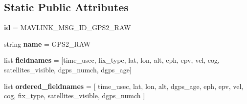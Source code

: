 \subsection*{Static Public Attributes}
\begin{DoxyCompactItemize}
\item 
\mbox{\label{classpymavlink_1_1dialects_1_1v10_1_1MAVLink__gps2__raw__message_a2f27c5748caecec007a6a31241020b2f}} 
{\bfseries id} = M\+A\+V\+L\+I\+N\+K\+\_\+\+M\+S\+G\+\_\+\+I\+D\+\_\+\+G\+P\+S2\+\_\+\+R\+AW
\item 
\mbox{\label{classpymavlink_1_1dialects_1_1v10_1_1MAVLink__gps2__raw__message_a249fe5ffeaf7b1a28dc012dd860c3f16}} 
string {\bfseries name} = \textquotesingle{}G\+P\+S2\+\_\+\+R\+AW\textquotesingle{}
\item 
\mbox{\label{classpymavlink_1_1dialects_1_1v10_1_1MAVLink__gps2__raw__message_aad5baf91d04e5888b9d4847061df9933}} 
list {\bfseries fieldnames} = \mbox{[}\textquotesingle{}time\+\_\+usec\textquotesingle{}, \textquotesingle{}fix\+\_\+type\textquotesingle{}, \textquotesingle{}lat\textquotesingle{}, \textquotesingle{}lon\textquotesingle{}, \textquotesingle{}alt\textquotesingle{}, \textquotesingle{}eph\textquotesingle{}, \textquotesingle{}epv\textquotesingle{}, \textquotesingle{}vel\textquotesingle{}, \textquotesingle{}cog\textquotesingle{}, \textquotesingle{}satellites\+\_\+visible\textquotesingle{}, \textquotesingle{}dgps\+\_\+numch\textquotesingle{}, \textquotesingle{}dgps\+\_\+age\textquotesingle{}\mbox{]}
\item 
\mbox{\label{classpymavlink_1_1dialects_1_1v10_1_1MAVLink__gps2__raw__message_abaa9ad9062aa0658e3e252b556f8cfd5}} 
list {\bfseries ordered\+\_\+fieldnames} = \mbox{[} \textquotesingle{}time\+\_\+usec\textquotesingle{}, \textquotesingle{}lat\textquotesingle{}, \textquotesingle{}lon\textquotesingle{}, \textquotesingle{}alt\textquotesingle{}, \textquotesingle{}dgps\+\_\+age\textquotesingle{}, \textquotesingle{}eph\textquotesingle{}, \textquotesingle{}epv\textquotesingle{}, \textquotesingle{}vel\textquotesingle{}, \textquotesingle{}cog\textquotesingle{}, \textquotesingle{}fix\+\_\+type\textquotesingle{}, \textquotesingle{}satellites\+\_\+visible\textquotesingle{}, \textquotesingle{}dgps\+\_\+numch\textquotesingle{} \mbox{]}

\end{DoxyCompactItemize}
